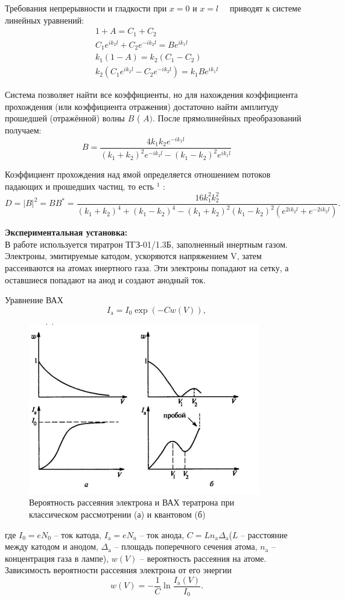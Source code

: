 \documentclass[a4paper, 12pt]{article}%
\begin{document}
	Требования непрерывности и гладкости при $x=0$ и $x=l \quad$ приводят к системе линейных уравнений:
	$$
	\begin{gathered}
		1+A=C_1+C_2 \\
		C_1 e^{i k_2 l}+C_2 e^{-i k_2 l}=B e^{i k_1 l} \\
		k_1(1-A)=k_2\left(C_1-C_2\right) \\
		k_2\left(C_1 e^{i k_2 l}-C_2 e^{-i k_2 l}\right)=k_1 B e^{i k_1 l}
	\end{gathered}
	$$
	
	Система позволяет найти все коэффициенты, но для нахождения коэффициента прохождения (или коэффициента отражения) достаточно найти амплитуду прошедшей (отражённой) волны $B$ ( $A)$. После прямолинейных преобразований получаем:
	$$
	B=\frac{4 k_1 k_2 e^{-i k_1 l}}{\left(k_1+k_2\right)^2 e^{-i k_2 l}-\left(k_1-k_2\right)^2 e^{i k_1 l}}
	$$
	
	Коэффициент прохождения над ямой определяется отношением потоков падающих и прошедших частиц, то есть ${ }^1$ :
	$$
	D=|B|^2=B B^*=\frac{16 k_1^2 k_2^2}{\left(k_1+k_2\right)^4+\left(k_1-k_2\right)^4-\left(k_1+k_2\right)^2\left(k_1-k_2\right)^2\left(e^{2 i k_2 l}+e^{-2 i k_2 l}\right)} .
	$$
	
	\textbf{Экспериментальная установка: }\\
	
	В работе используется тиратрон ТГЗ-01/1.3Б, заполненный инертным газом. Электроны, эмитируемые катодом, ускоряются напряжением V, затем рассеиваются на атомах инертного газа. Эти электроны попадают на сетку, а оставшиеся попадают на анод и создают анодный ток.
	
	Уравнение ВАХ 
	\begin{equation}\label{3}
		I_\text{a} = I_0 \exp\left( - C w(V) \right),
	\end{equation}

	\begin{figure}[H]
		\centering
		\includegraphics[width=0.6\linewidth]{compare}
		\caption{Вероятность рассеяния электрона и ВАХ тератрона при классическом рассмотрении (а) и квантовом (б)}
	\end{figure}
	где $I_0 = eN_0$ -- ток катода, $I_\text{a} = eN_a$ -- ток анода, $C = Ln_\text{a} \Delta_\text{a}$($L$ --  расстояние между катодом и анодом, $\Delta_\text{a}$ -- площадь поперечного сечения атома, $n_\text{a}$ -- концентрация газа в лампе), $w(V)$ -- вероятность рассеяния на атоме.
	Зависимость вероятности рассеяния электрона от его энергии
	\[\tag{5a}\label{5a}
	w(V) = -\dfrac{1}{C}\ln \dfrac{I_\text{a}(V)}{I_0}.
	\]
	
\end{document}
